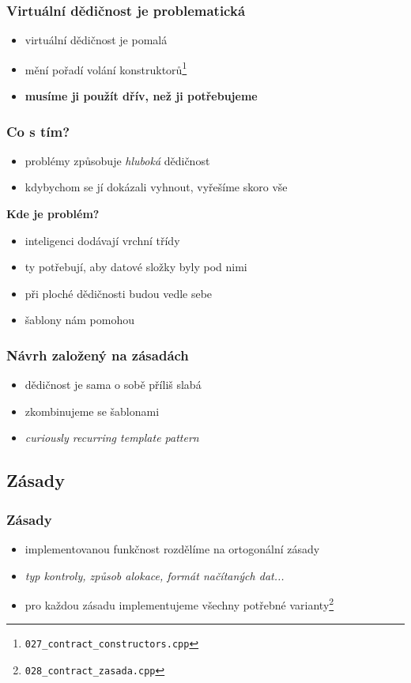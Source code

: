 \begin{frame}
	\frametitle{Virtuální dědičnost je problematická}
	\begin{itemize}
		\item{virtuální dědičnost je pomalá}
		\item{mění pořadí volání konstruktorů\footnote{\texttt{027\_contract\_constructors.cpp}}}
		\item{\textbf{musíme ji použít dřív, než ji potřebujeme}}
	\end{itemize}
\end{frame}

\begin{frame}
	\frametitle{Co s tím?}
	\begin{itemize}
		\item{problémy způsobuje \textit{hluboká} dědičnost}
		\item{kdybychom se jí dokázali vyhnout, vyřešíme skoro vše}
	\end{itemize}\pause
	\textbf{Kde je problém?}
	\begin{itemize}
		\item{inteligenci dodávají vrchní třídy}
		\item{ty potřebují, aby datové složky byly pod nimi}
		\item{při ploché dědičnosti budou vedle sebe}
		\item{šablony nám pomohou}
	\end{itemize}
\end{frame}

\begin{frame}
	\frametitle{Návrh založený na zásadách}
	\begin{itemize}
		\item{dědičnost je sama o sobě příliš slabá}
		\item{zkombinujeme se šablonami}
		\item{\textit{curiously recurring template pattern}}
	\end{itemize}
\end{frame}

\subsection{Zásady}

\begin{frame}
	\frametitle{Zásady}
	\begin{itemize}
		\item{implementovanou funkčnost rozdělíme na ortogonální zásady}
		\item{\textit{typ kontroly, způsob alokace, formát načítaných dat...}}
		\item{pro každou zásadu implementujeme všechny potřebné varianty\footnote{\texttt{028\_contract\_zasada.cpp}}}
	\end{itemize}
\end{frame}

